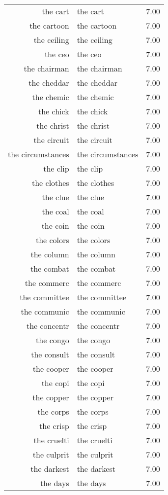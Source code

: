 \begin{table}[ht]
\begin{tabular}{rlr}
  the cart & the cart & 7.00 \\ 
  the cartoon & the cartoon & 7.00 \\ 
  the ceiling & the ceiling & 7.00 \\ 
  the ceo & the ceo & 7.00 \\ 
  the chairman & the chairman & 7.00 \\ 
  the cheddar & the cheddar & 7.00 \\ 
  the chemic & the chemic & 7.00 \\ 
  the chick & the chick & 7.00 \\ 
  the christ & the christ & 7.00 \\ 
  the circuit & the circuit & 7.00 \\ 
  the circumstances & the circumstances & 7.00 \\ 
  the clip & the clip & 7.00 \\ 
  the clothes & the clothes & 7.00 \\ 
  the clue & the clue & 7.00 \\ 
  the coal & the coal & 7.00 \\ 
  the coin & the coin & 7.00 \\ 
  the colors & the colors & 7.00 \\ 
  the column & the column & 7.00 \\ 
  the combat & the combat & 7.00 \\ 
  the commerc & the commerc & 7.00 \\ 
  the committee & the committee & 7.00 \\ 
  the communic & the communic & 7.00 \\ 
  the concentr & the concentr & 7.00 \\ 
  the congo & the congo & 7.00 \\ 
  the consult & the consult & 7.00 \\ 
  the cooper & the cooper & 7.00 \\ 
  the copi & the copi & 7.00 \\ 
  the copper & the copper & 7.00 \\ 
  the corps & the corps & 7.00 \\ 
  the crisp & the crisp & 7.00 \\ 
  the cruelti & the cruelti & 7.00 \\ 
  the culprit & the culprit & 7.00 \\ 
  the darkest & the darkest & 7.00 \\ 
  the days & the days & 7.00 \\ 

\end{tabular}
\end{table}
